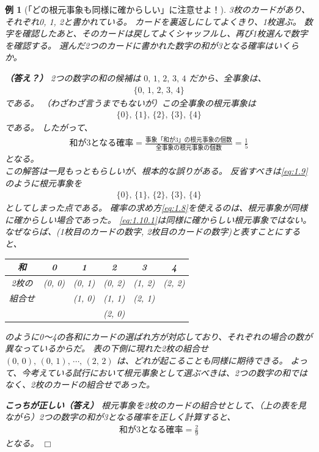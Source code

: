 \documentclass[12pt]{ltjsarticle}\usepackage{ifthen}\newcounter{enlarge}\setcounter{enlarge}{1}
\def\qed{\hfill $\Box$}
\newtheorem{eg}{例}
\begin{document}
\begin{eg}[「どの根元事象も同様に確からしい」に注意せよ！] \label{eg:1.1}
  3枚のカードがあり、それぞれ0, 1, 2と書かれている。
  カードを裏返しにしてよくきり、1枚選ぶ。
  数字を確認したあと、そのカードは戻してよくシャッフルし、再び1枚選んで数字を確認する。
  選んだ2つのカードに書かれた数字の和が3となる確率はいくらか。

  \textbf{（答え？）}
  2つの数字の和の候補は $0,\, 1,\, 2,\, 3,\, 4$ だから、全事象は、
  \begin{align}
    \{0,\, 1,\, 2,\, 3,\, 4\} \label{eq:1.9}
  \end{align}
  である。
  （わざわざ言うまでもないが）この全事象の根元事象は
  \begin{align}
    \{0\},\, \{1\},\, \{2\},\, \{3\},\, \{4\} \label{eq:1.9.1}
  \end{align}
  である。
  したがって、
  \begin{align}
    \text{和が3となる確率} = \frac{\text{事象「和が3」の根元事象の個数}}{\text{全事象の根元事象の個数}} = \frac{1}{5} \label{eq:1.10}
  \end{align}
  となる。\mbox{}\\

  この解答は一見もっともらしいが、根本的な誤りがある。
  反省すべきは\eqref{eq:1.9} のように根元事象を
  \begin{align}
    \{0\},\,\{1\},\,\{2\},\,\{3\},\,\{4\} \label{eq:1.10.1}
  \end{align}
  としてしまった点である。
  確率の求め方\eqref{eq:1.8}を使えるのは、根元事象が同様に確からしい場合であった。
  \eqref{eq:1.10.1}は同様に確からしい根元事象ではない。
  なぜならば、(1枚目のカードの数字, 2枚目のカードの数字)と表すことにすると、
  \begin{center}
  \begin{tabular}{c|ccccc} \hline
    和 & 0 & 1 & 2 & 3 & 4 \\ \hline
    2枚の & (0, 0) & (0, 1) & (0, 2) & (1, 2) & (2, 2) \\
    組合せ &  & (1, 0) & (1, 1) & (2, 1) &  \\
     &  &  & (2, 0) & & \\ \hline
  \end{tabular}
  \end{center}
  のように0〜4の各和にカードの選ばれ方が対応しており、それぞれの場合の数が異なっているからだ。
  表の下側に現れた2枚の組合せ $(0,\, 0),\, (0,\, 1),\, \cdots ,\, (2,\,2)$ は、どれが起こることも同様に期待できる。
  よって、今考えている試行において根元事象として選ぶべきは、2つの数字の和ではなく、2枚のカードの組合せであった。

  \textbf{こっちが正しい（答え）}
  根元事象を2枚のカードの組合せとして、（上の表を見ながら）2つの数字の和が3となる確率を正しく計算すると、
  \begin{align}
    \text{和が3となる確率} = \frac{2}{9} \label{eq:1.10}
  \end{align}
  となる。
\qed\end{eg}
\end{document}
